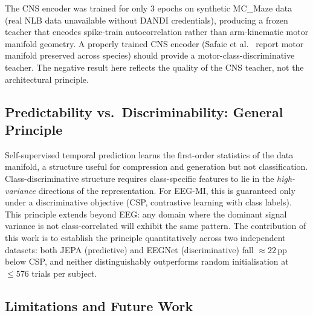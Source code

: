 \documentclass[journal]{IEEEtran}
\begin{document}
The CNS encoder was trained for only 3 epochs on synthetic MC\_Maze data (real NLB data unavailable without DANDI credentials), producing a frozen teacher that encodes spike-train autocorrelation rather than arm-kinematic motor manifold geometry.
A properly trained CNS encoder (Safaie et al.~\cite{safaie2023preserved} report motor manifold preserved across species) should provide a motor-class-discriminative teacher.
The negative result here reflects the quality of the CNS teacher, not the architectural principle.

\subsection{Predictability vs.\ Discriminability: General Principle}
\label{sec:pred_disc}

Self-supervised temporal prediction learns the first-order statistics of the data manifold, a structure useful for compression and generation but not classification.
Class-discriminative structure requires class-specific features to lie in the \emph{high-variance} directions of the representation.
For EEG-MI, this is guaranteed only under a discriminative objective (CSP, contrastive learning with class labels).
This principle extends beyond EEG: any domain where the dominant signal variance is not class-correlated will exhibit the same pattern.
The contribution of this work is to establish the principle quantitatively across two independent datasets: both JEPA (predictive) and EEGNet (discriminative) fall $\approx\!22$\,pp below CSP, and neither distinguishably outperforms random initialisation at $\leq\!576$ trials per subject.

\subsection{Limitations and Future Work}
\label{sec:limitations}
\end{document}
